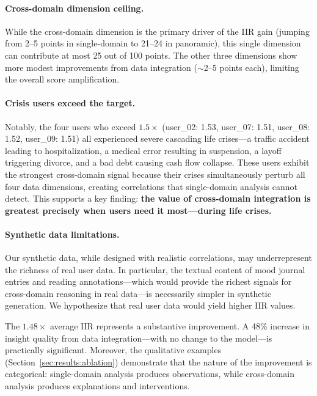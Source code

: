 \documentclass[11pt,a4paper]{article}
\newcommand{\iir}{\textsc{IIR}}
\begin{document}
\paragraph{Cross-domain dimension ceiling.} While the cross-domain dimension
is the primary driver of the \iir{} gain (jumping from 2--5 points in
single-domain to 21--24 in panoramic), this single dimension can contribute
at most 25 out of 100 points. The other three dimensions show more modest
improvements from data integration ($\sim$2--5 points each), limiting the
overall score amplification.

\paragraph{Crisis users exceed the target.} Notably, the four users who
exceed $1.5\times$ (user\_02: 1.53, user\_07: 1.51, user\_08: 1.52,
user\_09: 1.51) all experienced severe cascading life crises---a traffic
accident leading to hospitalization, a medical error resulting in
suspension, a layoff triggering divorce, and a bad debt causing cash flow
collapse. These users exhibit the strongest cross-domain signal because
their crises simultaneously perturb all four data dimensions, creating
correlations that single-domain analysis cannot detect. This supports a
key finding: \textbf{the value of cross-domain integration is greatest
precisely when users need it most---during life crises.}

\paragraph{Synthetic data limitations.} Our synthetic data, while designed
with realistic correlations, may underrepresent the richness of real user
data. In particular, the textual content of mood journal entries and reading
annotations---which would provide the richest signals for cross-domain
reasoning in real data---is necessarily simpler in synthetic generation. We
hypothesize that real user data would yield higher \iir{} values.

The $1.48\times$ average \iir{} represents a substantive improvement.
A 48\% increase in insight quality from data integration---with no change
to the model---is practically significant.
Moreover, the qualitative examples (Section~\ref{sec:results:ablation})
demonstrate that the nature of the improvement is categorical:
single-domain analysis produces observations, while cross-domain analysis
produces explanations and interventions.
\end{document}
